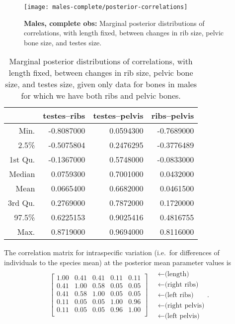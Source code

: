 \documentclass{article}
\begin{document}
\begin{figure}[ht]
  \begin{center}
    \texttt{[image: males-complete/posterior-correlations]}
  \end{center}
  \caption{\textbf{Males, complete obs:} Marginal posterior distributions of correlations, with length fixed,
  between changes in rib size, pelvic bone size, and testes size.
  \label{fig:males_complete_posterior_cors}
  }
\end{figure}


\begin{table}[ht]
\centering
\begin{tabular}{rrrr}
  \hline
        &  testes--ribs & testes--pelvis & ribs--pelvis \\
  \hline
 Min. &     -0.8087000  &   0.0594300 & -0.7689000   \\
 2.5\% &    -0.5075804  &   0.2476295 & -0.3776489   \\
 1st Qu. &  -0.1367000  &   0.5748000 & -0.0833000   \\
 Median &    0.0759300  &   0.7001000 &  0.0432000   \\
 Mean &      0.0665400  &   0.6682000 &  0.0461500   \\
 3rd Qu. &   0.2769000  &   0.7872000 &  0.1720000   \\
 97.5\%  &   0.6225153  &   0.9025416 &  0.4816755   \\
 Max. &      0.8719000  &   0.9694000 &  0.8116000   \\
   \hline
\end{tabular}
  \caption{Marginal posterior distributions of correlations, with length fixed,
  between changes in rib size, pelvic bone size, and testes size,
  given only data for bones in males for which we have both ribs and pelvic bones.
  \label{tab:complete_males_posterior_cors}
}
\end{table}

The correlation matrix for intraspecific variation 
(i.e.\ for differences of individuals to the species mean)
at the posterior mean parameter values is
\begin{align}
\begin{bmatrix}
   1.00 & 0.41 & 0.41 & 0.11 & 0.11 \\ 
   0.41 & 1.00 & 0.58 & 0.05 & 0.05 \\ 
   0.41 & 0.58 & 1.00 & 0.05 & 0.05 \\ 
   0.11 & 0.05 & 0.05 & 1.00 & 0.96 \\ 
   0.11 & 0.05 & 0.05 & 0.96 & 1.00 \\ 
 \end{bmatrix}
\quad \begin{matrix}
  \leftarrow \text{(length)} \\
  \leftarrow \text{(right ribs)} \\
  \leftarrow \text{(left ribs)} \\
  \leftarrow \text{(right pelvis)} \\
  \leftarrow \text{(left pelvis)} 
\end{matrix}  .
\end{align}




\end{document}
